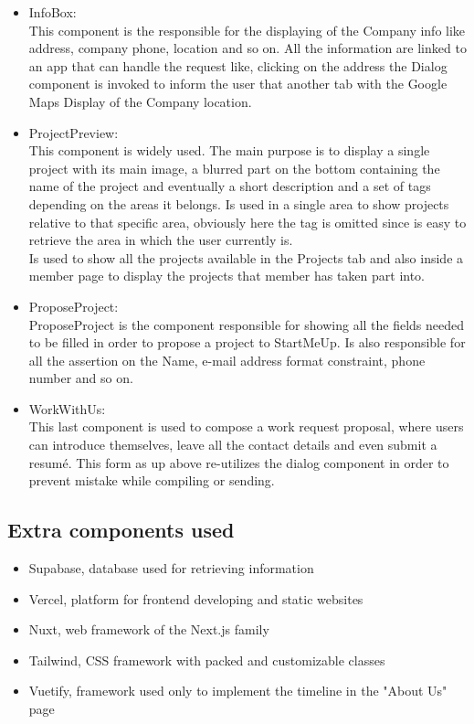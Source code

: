 \documentclass[11pt, letterpaper]{article}
\begin{document}
\begin{itemize}
    \item InfoBox: \\
        This component is the responsible for the displaying of the Company info like address, company phone, location and so on. All the information are linked to an app that can handle the request like, clicking on the address the Dialog component is invoked to inform the user that another tab with the Google Maps Display of the Company location.
    \item ProjectPreview: \\
        This component is widely used. The main purpose is to display a single project with its main image, a blurred part on the bottom containing the name of the project and eventually a short description and a set of tags depending on the areas it belongs.
        Is used in a single area to show projects relative to that specific area, obviously here the tag is omitted since is easy to retrieve the area in which the user currently is. \\
        Is used to show all the projects available in the Projects tab and also inside a member page to display the projects that member has taken part into. 
    \item ProposeProject: \\
        ProposeProject is the component responsible for showing all the fields needed to be filled in order to propose a project to StartMeUp. Is also responsible for all the assertion on the Name, e-mail address format constraint, phone number and so on.
    \item WorkWithUs: \\
        This last component is used to compose a work request proposal, where users can introduce themselves, leave all the contact details and even submit a resumé. This form as up above re-utilizes the dialog component in order to prevent mistake while compiling or sending.
\end{itemize}

\subsection{Extra components used}
\begin{itemize}
    \item Supabase, database used for retrieving information
    \item Vercel, platform for frontend developing and static websites
    \item Nuxt, web framework of the Next.js family
    \item Tailwind, CSS framework with packed and customizable classes
    \item Vuetify, framework used only to implement the timeline in the "About Us" page
\end{itemize}
\end{document}
